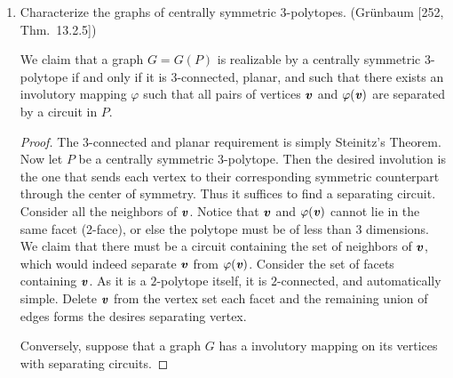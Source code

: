 \documentclass{article}
\begin{document}
\begin{enumerate}
\begin{solution}
\begin{figure}[h]
\caption{$3$-connected triangular grid}
\end{figure}
\end{solution}

\item Characterize the graphs of centrally symmetric $3$-polytopes.
(Grünbaum [252, Thm.~13.2.5])

\begin{solution}
We claim that a graph $G = G(P)$ is realizable by a centrally symmetric $3$-polytope if and only if it is 3-connected, planar, and such that there exists an involutory mapping $\varphi$ such that all pairs of vertices $\textbf{\textit{v}}$ and $\varphi(\textbf{\textit{v}})$ are separated by a circuit in $P$.

\begin{proof}
    The 3-connected and planar requirement is simply Steinitz's Theorem. Now let $P$ be a centrally symmetric $3$-polytope. Then the desired involution is the one that sends each vertex to their corresponding symmetric counterpart through the center of symmetry. Thus it suffices to find a separating circuit. Consider all the neighbors of $\textbf{\textit{v}}$. Notice that $\textbf{\textit{v}}$ and $\varphi(\textbf{\textit{v}})$ cannot lie in the same facet (2-face), or else the polytope must be of less than $3$ dimensions. We claim that there must be a circuit containing the set of neighbors of $\textbf{\textit{v}}$, which would indeed separate $\textbf{\textit{v}}$ from $\varphi(\textbf{\textit{v}})$. Consider the set of facets containing $\textbf{\textit{v}}$. As it is a $2$-polytope itself, it is $2$-connected, and automatically simple. Delete $\textbf{\textit{v}}$ from the vertex set each facet and the remaining union of edges forms the desires separating vertex.

    Conversely, suppose that a graph $G$ has a involutory mapping on its vertices with separating circuits.
\end{proof}

\begin{figure}[h]
    \centering
{}
\end{figure}
\end{solution}
\end{enumerate}
\end{document}
